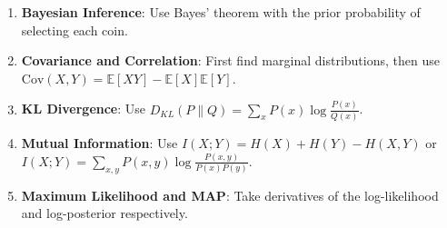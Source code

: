 \begin{enumerate}
\item \textbf{Bayesian Inference}: Use Bayes' theorem with the prior probability of selecting each coin.
\item \textbf{Covariance and Correlation}: First find marginal distributions, then use $\text{Cov}(X,Y) = \mathbb{E}[XY] - \mathbb{E}[X]\mathbb{E}[Y]$.
\item \textbf{KL Divergence}: Use $D_{KL}(P \| Q) = \sum_x P(x) \log \frac{P(x)}{Q(x)}$.
\item \textbf{Mutual Information}: Use $I(X;Y) = H(X) + H(Y) - H(X,Y)$ or $I(X;Y) = \sum_{x,y} P(x,y) \log \frac{P(x,y)}{P(x)P(y)}$.
\item \textbf{Maximum Likelihood and MAP}: Take derivatives of the log-likelihood and log-posterior respectively.
\end{enumerate}
